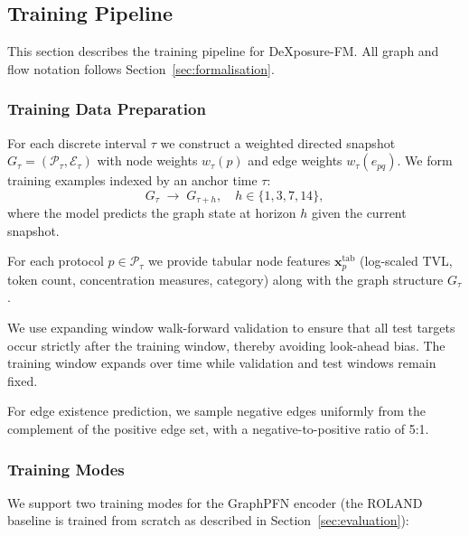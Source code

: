 \documentclass[preprint,12pt]{elsarticle}
\renewcommand{\paragraph}[1]{}
\begin{document}
 \subsection{Training Pipeline}
\label{sec:training}

This section describes the training pipeline for DeXposure-FM. All graph and flow notation follows Section~\ref{sec:formalisation}.

\subsubsection{Training Data Preparation}

For each discrete interval $\tau$ we construct a weighted directed snapshot $G_{\tau}=(\mathcal P_{\tau},\mathcal E_{\tau})$ with node weights $w_{\tau}(p)$ and edge weights $w_{\tau}(e_{pq})$. We form training examples indexed by an anchor time $\tau$:
\begin{equation}
G_{\tau} \;\longrightarrow\; G_{\tau+h}, \quad h \in \{1, 3, 7, 14\},
\end{equation}
where the model predicts the graph state at horizon $h$ given the current snapshot.

For each protocol $p\in\mathcal P_{\tau}$ we provide tabular node features $\mathbf x^{\mathrm{tab}}_{p}$ (log-scaled TVL, token count, concentration measures, category) along with the graph structure $G_{\tau}$.

\paragraph{Time-based expanding window splits.}
We use expanding window walk-forward validation to ensure that all test targets occur strictly after the training window, thereby avoiding look-ahead bias. The training window expands over time while validation and test windows remain fixed.

\paragraph{Negative sampling.}
For edge existence prediction, we sample negative edges uniformly from the complement of the positive edge set, with a negative-to-positive ratio of 5:1.

\subsubsection{Training Modes}

We support two training modes for the GraphPFN encoder (the ROLAND baseline is trained from scratch as described in Section~\ref{sec:evaluation}):
\end{document}
